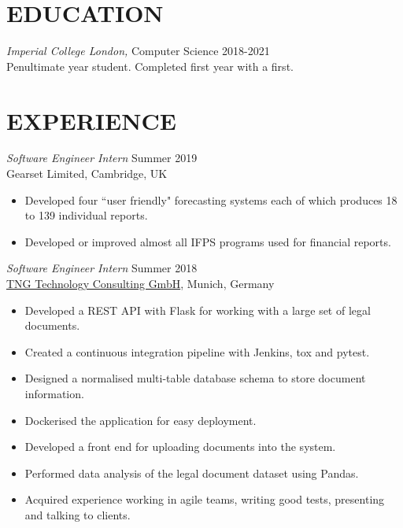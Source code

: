 \documentclass[margin, 10pt]{res} %
\begin{document}
\begin{resume}


\section{EDUCATION}

{\sl Imperial College London,} Computer Science \hfill 2018-2021\\
Penultimate year student. Completed first year with a first.
 
 
\section{EXPERIENCE}

{\sl Software Engineer Intern} \hfill Summer 2019\\
Gearset Limited, Cambridge, UK

\begin{itemize} \itemsep -2pt %
\item Developed four ``user friendly" forecasting systems each of which produces 18 to 139 individual reports. 
\item Developed or improved almost all IFPS programs used for financial reports. 
\end{itemize}
 
{\sl Software Engineer Intern} \hfill Summer 2018\\
\href{https://www.tngtech.com/en.html}{TNG Technology Consulting GmbH}, Munich, Germany

\begin{itemize} \itemsep -2pt
	\item Developed a REST API with Flask for working with a large set of legal documents.
    \item Created a continuous integration pipeline with Jenkins, tox and pytest.
    \item Designed a normalised multi-table database schema to store document information.
    \item Dockerised the application for easy deployment.
    \item Developed a front end for uploading documents into the system.
    \item Performed data analysis of the legal document dataset using Pandas.
    \item Acquired experience working in agile teams, writing good tests, presenting and talking to clients.
\end{itemize}


\end{resume}
\end{document}
